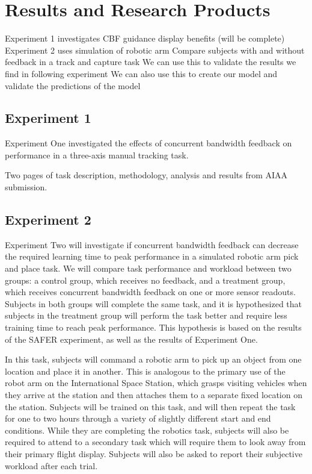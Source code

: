 \documentclass{paper}
\begin{document}
\section{Results and Research Products}
Experiment 1 investigates CBF guidance display benefits (will be complete)
Experiment 2 uses simulation of robotic arm
Compare subjects with and without feedback in a track and capture task
We can use this to validate the results we find in following experiment
We can also use this to create our model and validate the predictions of the model

\subsection{Experiment 1}
Experiment One investigated the effects of concurrent bandwidth feedback on performance in a three-axis manual tracking task.

Two pages of task description, methodology, analysis and results from AIAA submission.

\subsection{Experiment 2}
Experiment Two will investigate if concurrent bandwidth feedback can decrease the required learning time to peak performance in a simulated robotic arm pick and place task.
We will compare task performance and workload between two groups: a control group, which receives no feedback, and a treatment group, which receives concurrent bandwidth feedback on one or more sensor readouts.
Subjects in both groups will complete the same task, and it is hypothesized that subjects in the treatment group will perform the task better and require less training time to reach peak performance.
This hypothesis is based on the results of the SAFER experiment, as well as the results of Experiment One.

In this task, subjects will command a robotic arm to pick up an object from one location and place it in another.
This is analogous to the primary use of the robot arm on the International Space Station, which grasps visiting vehicles when they arrive at the station and then attaches them to a separate fixed location on the station.
Subjects will be trained on this task, and will then repeat the task for one to two hours through a variety of slightly different start and end conditions.
While they are completing the robotics task, subjects will also be required to attend to a secondary task which will require them to look away from their primary flight display.
Subjects will also be asked to report their subjective workload after each trial.
\end{document}
